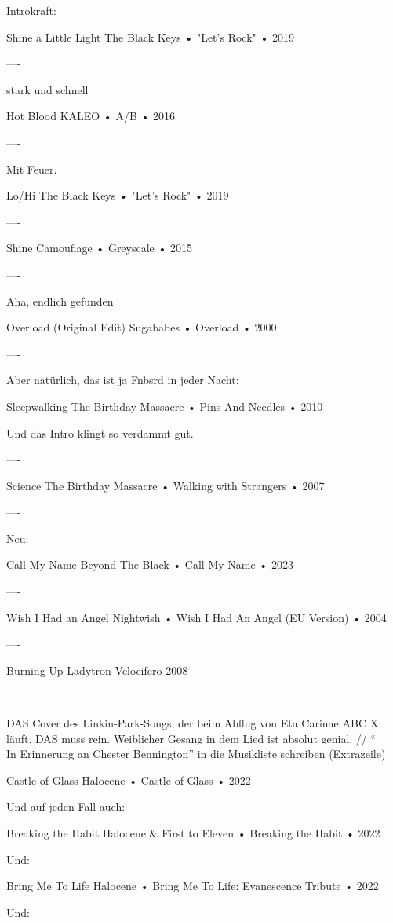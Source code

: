 Introkraft:

Shine a Little Light
The Black Keys
 •
"Let's Rock"
 •
2019

----

stark und schnell

Hot Blood
KALEO
 •
A/B
 •
2016

----

Mit Feuer.

Lo/Hi
The Black Keys
 •
"Let's Rock"
 •
2019

----

Shine
Camouflage
 •
Greyscale
 •
2015

----

Aha, endlich gefunden

Overload (Original Edit)
Sugababes
 •
Overload
 •
2000

----

Aber natürlich, das ist ja Fnbsrd in jeder Nacht:

Sleepwalking
The Birthday Massacre
 •
Pins And Needles
 •
2010

Und das Intro klingt so verdammt gut.

----

Science
The Birthday Massacre
 •
Walking with Strangers
 •
2007

----

Neu:

Call My Name
Beyond The Black
 •
Call My Name
 •
2023

----

Wish I Had an Angel
Nightwish
 •
Wish I Had An Angel (EU Version)
 •
2004

----

Burning Up
Ladytron
Velocifero
2008

----

DAS Cover des Linkin-Park-Songs, der beim Abflug von Eta Carinae ABC X läuft. DAS muss rein. Weiblicher Gesang in dem Lied ist absolut genial. // “\\In Erinnerung an Chester Bennington” in die Musikliste schreiben (Extrazeile)

Castle of Glass
Halocene
 •
Castle of Glass
 •
2022

Und auf jeden Fall auch:

Breaking the Habit
Halocene
 &
First to Eleven
 •
Breaking the Habit
 •
2022

Und:

Bring Me To Life
Halocene
 •
Bring Me To Life: Evanescence Tribute
 •
2022

Und:

